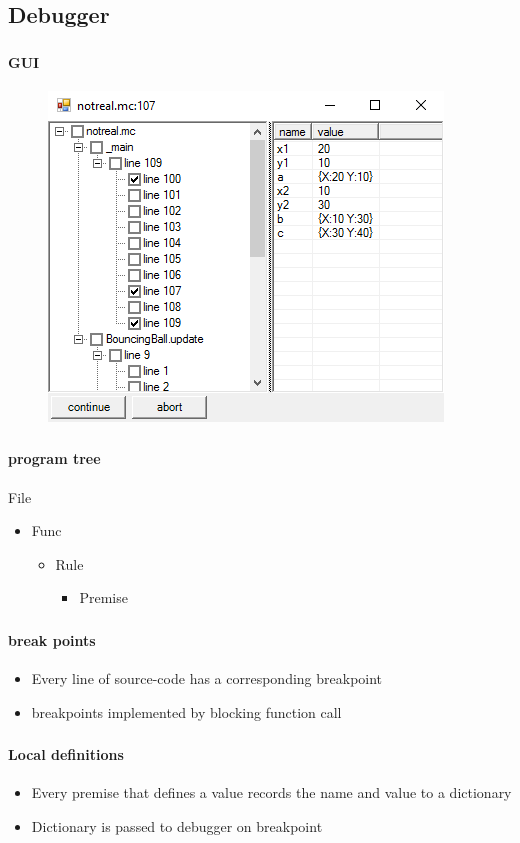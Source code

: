\subsection{Debugger}

\begin{frame}
    \frametitle{\subsecname}
    \framesubtitle{GUI}
    \begin{figure}
        \includegraphics[scale=0.5]{debugger}
    \end{figure}
\end{frame}

\begin{frame}
    \frametitle{\subsecname}
    \framesubtitle{program tree}
    File
    \begin{itemize}
        \item Func
        \begin{itemize}
            \item Rule
            \begin{itemize}
                \item Premise
            \end{itemize}
        \end{itemize}
    \end{itemize}
\end{frame}

\begin{frame}
    \frametitle{\subsecname}
    \framesubtitle{break points}
    \begin{itemize}
        \item Every line of source-code has a corresponding breakpoint
        \item breakpoints implemented by blocking function call
    \end{itemize}
\end{frame}

\begin{frame}
    \frametitle{\subsecname}
    \framesubtitle{Local definitions}
    \begin{itemize}
        \item Every premise that defines a value records the name and value to a dictionary
        \item Dictionary is passed to debugger on breakpoint
    \end{itemize}
    
\end{frame}

